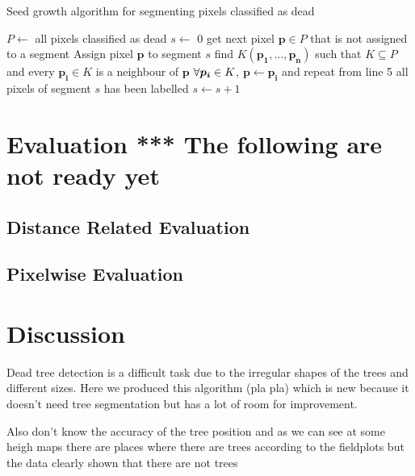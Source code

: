 \documentclass{subfiles}
\begin{document}
 \begin{algorithm}
 	\caption{Seed growth algorithm for segmenting pixels classified as dead}
 	\label{alg:seedGrownth}
 	\centering
 	\begin{algorithmic}[1]
 		\State $P \gets $ all pixels classified as dead  %
 		\State $s \gets $ 0 
        \State get next pixel $\boldsymbol{p} \in P$ that is not assigned to a segment
 		\State  Assign pixel $\boldsymbol{p} $ to segment $s$
 		\State  find $K(\boldsymbol{p_1},\dots, \boldsymbol{p_n})$ such that $K \subseteq P$ and every $\boldsymbol{p_i} \in K$ is a neighbour of $\boldsymbol{p}$
 		\State $ \forall \space \boldsymbol{p_i} \in K $, $\boldsymbol{p} \gets \boldsymbol{p_i}$ and repeat from line 5
 		\State all pixels of segment $s$ has been labelled
 		\State $s \gets s + 1 $
 		\EndWhile
 	\end{algorithmic}
 \end{algorithm}



\section{Evaluation {\color{red} *** The following are not ready yet}} 


   \subsection{Distance Related Evaluation}


   \subsection{Pixelwise Evaluation}
		
		
\section{Discussion}

\par Dead tree detection is a difficult task due to the irregular shapes of the trees and different sizes. Here we produced this algorithm (pla pla) which is new because it doesn't need tree segmentation but has a lot of room for improvement. 

Also don't know the accuracy of the tree position and as we can see at some heigh maps there are places where there are trees according to the fieldplots but the data clearly shown that there are not trees
\end{document}
